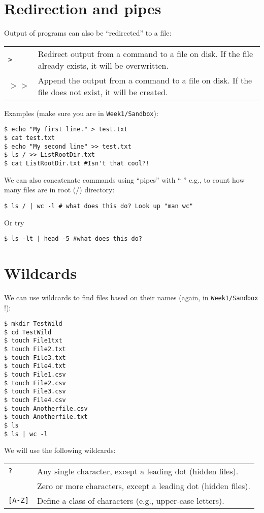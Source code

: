 \section{Redirection and pipes}

Output of programs can also be ``redirected'' to a file:

\begin{tabular}{p{} p{}} 
  {\tt >} & Redirect output from a command to a file on disk. If
    the file already exists, it will be overwritten.\\
  {$>>$} & Append the output from a command to a file on disk. If
    the file does not exist, it will be created.\\
\end{tabular}
 
Examples (make sure you are in {\tt Week1/Sandbox}):
      
\begin{lstlisting}
$ echo "My first line." > test.txt
$ cat test.txt
$ echo "My second line" >> test.txt
$ ls / >> ListRootDir.txt
$ cat ListRootDir.txt #Isn't that cool?!
\end{lstlisting}
 
We can also concatenate commands using ``pipes'' with ``$\vert$'' e.g., 
to count how many files are in root (/) directory:
\begin{lstlisting}
$ ls / | wc -l # what does this do? Look up "man wc"
\end{lstlisting}
Or try
\begin{lstlisting}
$ ls -lt | head -5 #what does this do?
\end{lstlisting}

\section{Wildcards}

We can use wildcards to find files based on their names (again, in 
{\tt Week1/Sandbox} !):
 
\begin{lstlisting}
$ mkdir TestWild
$ cd TestWild
$ touch File1txt
$ touch File2.txt
$ touch File3.txt
$ touch File4.txt
$ touch File1.csv
$ touch File2.csv
$ touch File3.csv
$ touch File4.csv
$ touch Anotherfile.csv
$ touch Anotherfile.txt
$ ls 
$ ls | wc -l
\end{lstlisting}

We will use the following wildcards:

\begin{tabular}{p{} p{}} 
  {\tt ?} & Any single character, except a leading dot (hidden 
  files).\\
  {\tt *} & Zero or more characters, except a leading dot (hidden 
  files).\\
	{\tt [A-Z]} & Define a class of characters (e.g., upper-case 
	letters).\\
\end{tabular}
 
